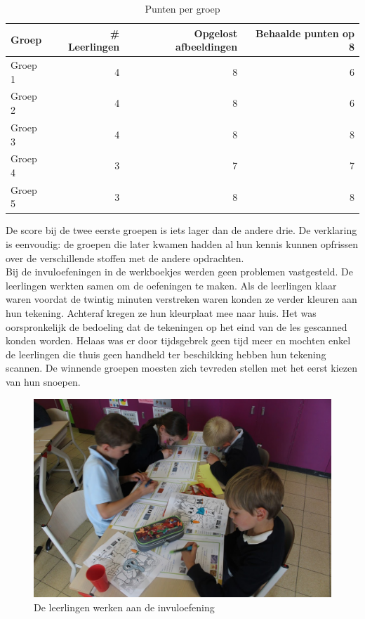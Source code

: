 \documentclass[pdftex,a4paper,12pt,twoside]{report}
\begin{document}
\begin{table}[h]
\begin{center}
\label{table:scores}
\caption{Punten per groep}
\vspace{5pt}
\begin{tabular}{l | r | r | r}
Groep & \# Leerlingen & Opgelost afbeeldingen & Behaalde punten op 8 \\
\hline
Groep 1 & 4 & 8 & 6 \\
Groep 2 & 4 & 8 & 6 \\
Groep 3 & 4 & 8 & 8 \\
Groep 4 & 3 & 7 & 7 \\
Groep 5 & 3 & 8 & 8 \\
\end{tabular}
\end{center}
\end{table}

De score bij de twee eerste groepen is iets lager dan de andere drie. De verklaring is eenvoudig: de groepen die later kwamen hadden al hun kennis kunnen opfrissen over de verschillende stoffen met de andere opdrachten. \\

Bij de invuloefeningen in de werkboekjes werden geen problemen vastgesteld. De leerlingen werkten samen om de oefeningen te maken. Als de leerlingen klaar waren voordat de twintig minuten verstreken waren konden ze verder kleuren aan hun tekening. Achteraf kregen ze hun kleurplaat mee naar huis. Het was oorspronkelijk de bedoeling dat de tekeningen op het eind van de les gescanned konden worden. Helaas was er door tijdsgebrek geen tijd meer en mochten enkel de leerlingen die thuis  geen handheld ter beschikking hebben hun tekening scannen. De winnende groepen moesten zich tevreden stellen met het eerst kiezen van hun snoepen.

\begin{figure}
\includegraphics[scale=0.11]{klas2}
\caption{De leerlingen werken aan de invuloefening}
\end{figure}
\end{document}
